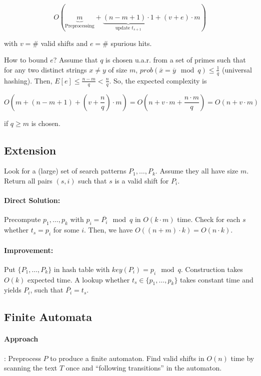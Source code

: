 $$O(\underbrace{m}_\text{Preprocessing} + \underbrace{(n-m+1) \cdot 1}_\text{update $t_{s+1}$} + (v + e)\cdot m)$$

with $v = \#$ valid shifts and $e = \#$ spurious hits.

How to bound $e$? Assume that $q$ is chosen u.a.r. from a set of primes such that for any two distinct strings $x \neq y$ of size $m$, ${prob}(\overline{x}=\overline{y} \mod q) \le \frac{1}{q}$ (universal hashing). Then, $E[e] \le \frac{n-m}{q} < \frac{n}{q}$. So, the expected complexity is

$$O(m + (n - m + 1) + (v + \frac{n}{q}) \cdot m) = O(n + v \cdot m + \frac{n \cdot m}{q}) = O(n + v \cdot m)$$

if $q \ge m$ is chosen.


\subsection{Extension}

Look for a (large) set of search patterns $P_1, \ldots, P_k$. Assume they all have size $m$. Return all pairs $(s,i)$ such that $s$ is a valid shift for $P_i$.

\paragraph{Direct Solution:} Precompute $p_1, \ldots, p_k$ with $p_i = \overline{P_i} \mod q$ in $O(k \cdot m)$ time. Check for each $s$ whether $t_s = p_i$ for some $i$. Then, we have $O((n+m) \cdot k) = O(n \cdot k)$.

\paragraph{Improvement:}  Put $\{P_1, \ldots, P_k\}$ in hash table with ${key}(P_i)=p_i \mod q$. Construction takes $O(k)$ expected time. A lookup whether $t_s \in \{p_1, \ldots, p_k\}$ takes constant time and yields $P_i$, such that $\overline{P_i} = t_s$.

\subsection{Finite Automata}

\paragraph{Approach}: Preprocess $P$ to produce a finite automaton. Find valid shifts in $O(n)$ time by scanning the text $T$ once and ``following transitions'' in the automaton.

